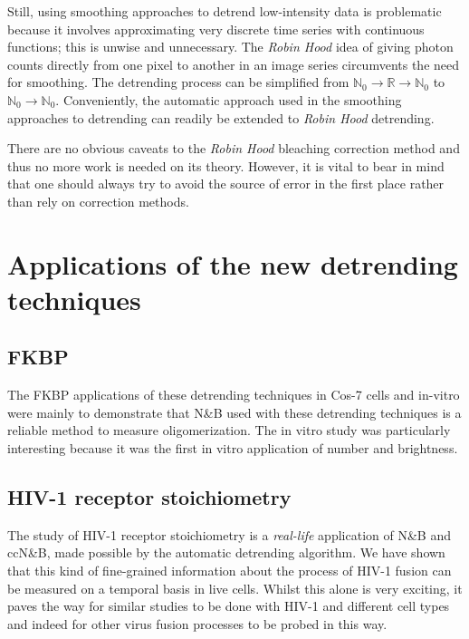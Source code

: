 \documentclass[12pt,]{book}
\theoremstyle{definition}
\theoremstyle{definition}
\theoremstyle{definition}
\theoremstyle{remark}
\begin{document}
Still, using smoothing approaches to detrend low-intensity data is
problematic because it involves approximating very discrete time series
with continuous functions; this is unwise and unnecessary. The
\emph{Robin Hood} idea of giving photon counts directly from one pixel
to another in an image series circumvents the need for smoothing. The
detrending process can be simplified from
\(\mathbb{N}_0 \rightarrow \mathbb{R} \rightarrow \mathbb{N}_0\) to
\(\mathbb{N}_0 \rightarrow \mathbb{N}_0\). Conveniently, the automatic
approach used in the smoothing approaches to detrending can readily be
extended to \emph{Robin Hood} detrending.

There are no obvious caveats to the \emph{Robin Hood} bleaching
correction method and thus no more work is needed on its theory.
However, it is vital to bear in mind that one should always try to avoid
the source of error in the first place rather than rely on correction
methods.

\section{Applications of the new detrending
techniques}\label{applications-of-the-new-detrending-techniques}

\subsection{FKBP}\label{fkbp}

The FKBP applications of these detrending techniques in Cos-7 cells
\citep{nandb} and in-vitro were mainly to demonstrate that N\&B used
with these detrending techniques is a reliable method to measure
oligomerization. The in vitro study \citep{JOVE} was particularly
interesting because it was the first in vitro application of number and
brightness.

\subsection{HIV-1 receptor
stoichiometry}\label{hiv-1-receptor-stoichiometry-1}

The study of HIV-1 receptor stoichiometry \citep{HIVstoichiometry} is a
\emph{real-life} application of N\&B and ccN\&B, made possible by the
automatic detrending algorithm. We have shown that this kind of
fine-grained information about the process of HIV-1 fusion can be
measured on a temporal basis in live cells. Whilst this alone is very
exciting, it paves the way for similar studies to be done with HIV-1 and
different cell types and indeed for other virus fusion processes to be
probed in this way.
\end{document}
